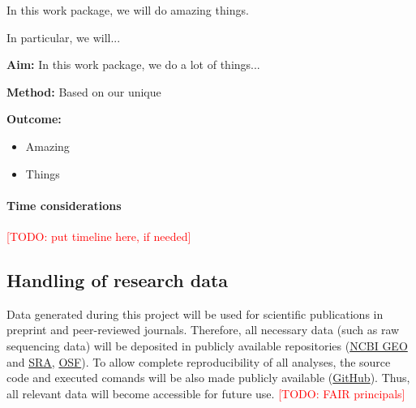 \documentclass[american,firsttime]{dfgproposal}
\newcommand{\todo}[1]{\xspace{\textcolor{red}{[TODO: #1]}}\xspace}
\begin{document}
	\begin{workpackage}
		In this work package, we will do amazing things.
		
		In particular, we will...
		\blindtext
	\end{workpackage}
	\begin{wpsummary}
		\textbf{Aim:}
		In this work package, we do a lot of things...
		
		\textbf{Method:}
		Based on our unique 
		
		\textbf{Outcome:}
		\begin{itemize}
			\item Amazing
			\item Things
		\end{itemize}
	\end{wpsummary}
	
	
	
	\paragraph*{Time considerations}
	\todo{put timeline here, if needed}
	
	
	
	
	\subsection{Handling of research data}
	Data generated during this project will be used for scientific publications in
	preprint and peer-reviewed journals. Therefore, all necessary data (such as raw
	sequencing data) will be deposited in publicly available repositories
	(\href{https://www.ncbi.nlm.nih.gov/geo/}{NCBI GEO} and
	\href{https://www.ncbi.nlm.nih.gov/sra}{SRA}, \href{https://osf.io/}{OSF}). To
	allow complete reproducibility of all analyses, the source code and executed
	comands will be also made publicly available
	(\href{https://github.com/}{GitHub}).  Thus, all relevant data will become
	accessible for future use. 
	\todo{FAIR principals}
	
\end{document}
